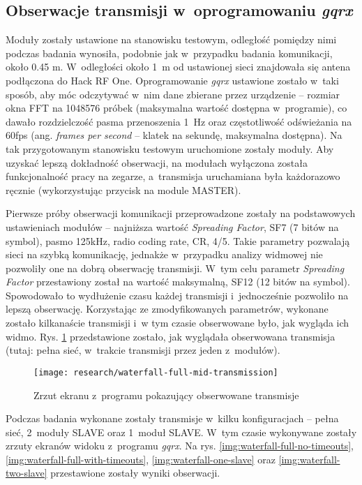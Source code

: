 \subsection{\label{sect:spectral-in-gqrx}Obserwacje transmisji w~oprogramowaniu \textsl{gqrx}} Moduły zostały ustawione
na stanowisku testowym, odległość pomiędzy nimi podczas badania wynosiła, podobnie jak w~przypadku badania komunikacji,
około 0.45 m. W~odległości około 1~m od ustawionej sieci znajdowała się antena podłączona do Hack RF One. Oprogramowanie
\textsl{gqrx} ustawione zostało w~taki sposób, aby móc odczytywać w~nim dane zbierane przez urządzenie -- rozmiar okna
FFT na 1048576 próbek (maksymalna wartość dostępna w~programie), co dawało rozdzielczość pasma przenoszenia 1~Hz oraz
częstotliwość odświeżania na 60fps (ang. \textsl{frames per second} -- klatek na sekundę, maksymalna dostępna). Na tak
przygotowanym stanowisku testowym uruchomione zostały moduły. Aby uzyskać lepszą dokładność obserwacji, na modułach
wyłączona została funkcjonalność pracy na zegarze, a~transmisja uruchamiana była każdorazowo ręcznie (wykorzystując
przycisk na module MASTER).

Pierwsze próby obserwacji komunikacji przeprowadzone zostały na podstawowych ustawieniach modułów -- najniższa wartość
\textsl{Spreading Factor}, SF7 (7 bitów na symbol), pasmo 125kHz, radio coding rate, CR, 4/5. Takie parametry pozwalają sieci na
szybką komunikację, jednakże w~przypadku analizy widmowej nie pozwoliły one na dobrą obserwację transmisji. W~tym celu
parametr \textsl{Spreading Factor} przestawiony został na wartość maksymalną, SF12 (12 bitów na symbol). Spowodowało to
wydłużenie czasu każdej transmisji i~jednocześnie pozwoliło na lepszą obserwację. Korzystając ze zmodyfikowanych
parametrów, wykonane zostało kilkanaście transmisji i~w tym czasie obserwowane było, jak wygląda ich widmo. Rys.
\ref{img:waterfall-full-mid-transmission} przedstawione zostało, jak wyglądała obserwowana transmisja (tutaj: pełna sieć,
w~trakcie transmisji przez jeden z~modułów).

\begin{figure}[!htbp]
    \centering
    \texttt{[image: research/waterfall-full-mid-transmission]}
    \caption{\label{img:waterfall-full-mid-transmission}Zrzut ekranu z~programu pokazujący obserwowane transmisje}
\end{figure}

\FloatBarrier
Podczas badania wykonane zostały transmisje w~kilku konfiguracjach -- pełna sieć, 2~moduły SLAVE oraz 1~moduł SLAVE.
W~tym czasie wykonywane zostały zrzuty ekranów widoku z~programu \textsl{gqrx}. Na rys.
\ref{img:waterfall-full-no-timeouts}, \ref{img:waterfall-full-with-timeouts}, \ref{img:waterfall-one-slave} oraz
\ref{img:waterfall-two-slave} przestawione zostały wyniki obserwacji.

